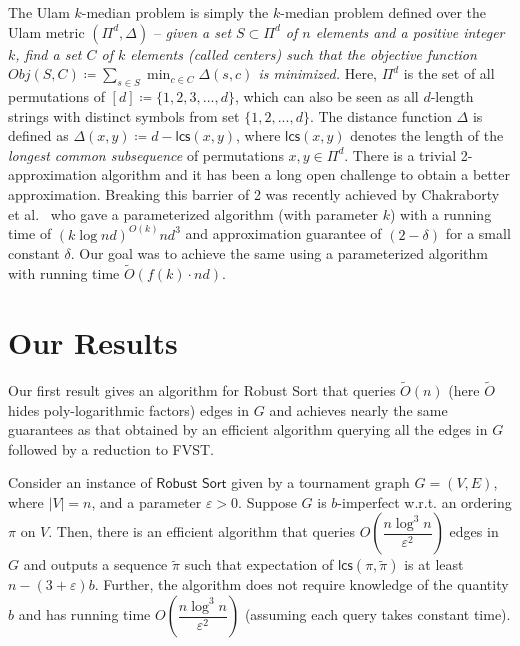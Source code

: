 \documentclass[11pt]{llncs}
\newcommand{\tpi}{{\widetilde \pi}}
\newcommand{\tO}{{\widetilde O}}
\newcommand{\robust}{{\textsf{Robust Sort}}\xspace}
\newcommand{\lcs}{{\textsf{lcs}}}
\begin{document}
 The Ulam $ k$-median problem is simply the $k$-median problem defined over the Ulam metric $(\Pi^d, \Delta)$ -- {\it given a set $S \subset \Pi^d$ of $n$ elements and a positive integer $k$, find a set $C$ of $k$ elements (called centers) such that the objective function $Obj(S, C) \coloneqq \sum_{s \in S} \min_{c \in C} \Delta(s, c)$ is minimized.}
Here, $\Pi^d$ is the set of all permutations of $[d] \coloneqq \{1, 2, 3, ..., d\}$, which can also be seen as all $d$-length strings with distinct symbols from set $\{1, 2, ..., d\}$.
The distance function $\Delta$ is defined as $\Delta(x, y) \coloneq d - \lcs(x, y)$, where $\lcs(x, y)$ denotes the length of the {\em longest common subsequence} of permutations $x, y \in \Pi^d$. There is a trivial 2-approximation algorithm and it has been a long open challenge to obtain a better approximation. Breaking this barrier of 2 was recently achieved by Chakraborty et al.~\cite{cdk23} who gave a parameterized algorithm (with parameter $k$) with a running time of $(k \log{nd})^{O(k)} nd^3$ and approximation guarantee of $(2-\delta)$ for a small constant $\delta$. Our goal was to achieve the same using a parameterized algorithm with running time $\tilde{O}(f(k) \cdot nd)$.





\section{Our Results}
Our first result gives an algorithm for \robust that queries $\tO(n)$ (here $\tO$ hides poly-logarithmic factors) edges in $G$ and achieves nearly the same guarantees as that obtained by an efficient algorithm querying all the edges in $G$ followed by a reduction to FVST.
\begin{theorem} \label{thm:rsort}
    Consider an instance of $\robust$ given by a tournament graph $G=(V,E)$, where $|V| = n$,  and a parameter 
   $\varepsilon > 0$. Suppose $G$ is $b$-imperfect w.r.t. an ordering $\pi$ on $V$. Then, there is an efficient algorithm that queries $O\left(\dfrac{n \log^3 n}{\varepsilon^2}\right)$ edges in $G$ and outputs a sequence $\tpi$ such that expectation of $\lcs(\pi, \tpi)$ is at least  $n-(3+\varepsilon)b.$ Further, the algorithm does not require  knowledge of the quantity $b$ and has running time $O\left(\dfrac{n \log^3 n}{\varepsilon^2}\right)$ (assuming each query takes constant time). 
\end{theorem}
\end{document}
